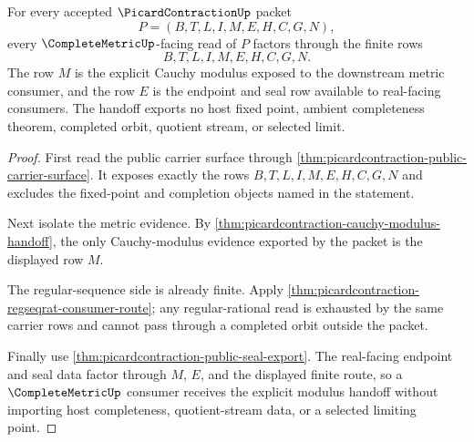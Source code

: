 \begin{theorem}
\label{thm:picard-contraction-complete-metric-handoff}
For every accepted $\PicardContractionUp$ packet
$$
P=(B,T,L,I,M,E,H,C,G,N),
$$
every $\CompleteMetricUp$-facing read of $P$ factors through the finite rows
$$
B,T,L,I,M,E,H,C,G,N.
$$
The row $M$ is the explicit Cauchy modulus exposed to the downstream metric consumer, and the row $E$ is the endpoint and seal row available to real-facing consumers. The handoff exports no host fixed point, ambient completeness theorem, completed orbit, quotient stream, or selected limit.
\end{theorem}
\begin{proof}
First read the public carrier surface through \autoref{thm:picardcontraction-public-carrier-surface}. It exposes exactly the rows $B,T,L,I,M,E,H,C,G,N$ and excludes the fixed-point and completion objects named in the statement.

Next isolate the metric evidence. By \autoref{thm:picardcontraction-cauchy-modulus-handoff}, the only Cauchy-modulus evidence exported by the packet is the displayed row $M$.

The regular-sequence side is already finite. Apply \autoref{thm:picardcontraction-regseqrat-consumer-route}; any regular-rational read is exhausted by the same carrier rows and cannot pass through a completed orbit outside the packet.

Finally use \autoref{thm:picardcontraction-public-seal-export}. The real-facing endpoint and seal data factor through $M$, $E$, and the displayed finite route, so a $\CompleteMetricUp$ consumer receives the explicit modulus handoff without importing host completeness, quotient-stream data, or a selected limiting point.
\end{proof}

